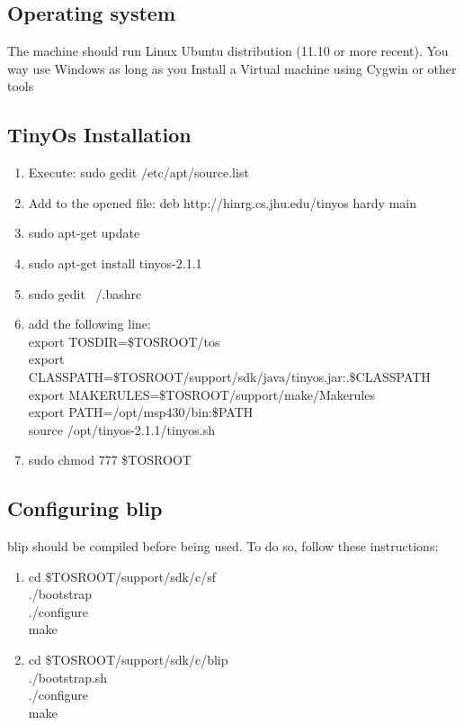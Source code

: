 \documentclass[oneside,12pt,a4paper,final]{book}
\begin{document}
\subsection{Operating system}
The machine should run Linux Ubuntu distribution (11.10 or more recent). You way use Windows as long as you Install a Virtual machine using Cygwin or other tools
\subsection{TinyOs Installation}
\begin{enumerate}
\item Execute: sudo gedit /etc/apt/source.list
\item Add to the opened file: deb http://hinrg.cs.jhu.edu/tinyos hardy main
\item sudo apt-get update 
\item sudo apt-get install tinyos-2.1.1
\item sudo gedit ~/.bashrc
\item add the following line: \\
export TOSDIR=\$TOSROOT/tos \\
export CLASSPATH=\$TOSROOT/support/sdk/java/tinyos.jar:.\$CLASSPATH \\
export MAKERULES=\$TOSROOT/support/make/Makerules \\
export PATH=/opt/msp430/bin:\$PATH \\
source /opt/tinyos-2.1.1/tinyos.sh \\

\item sudo chmod 777 \$TOSROOT
\end{enumerate}

\subsection{Configuring \gls{blip}}
\gls{blip} should be compiled before being used. To do so, follow these instructions:
\begin{enumerate}
\item cd \$TOSROOT/support/sdk/c/sf \\
./bootstrap \\
./configure \\
make 
\item cd \$TOSROOT/support/sdk/c/blip \\
./bootstrap.sh \\
./configure \\
make 
\end{enumerate}
\end{document}
